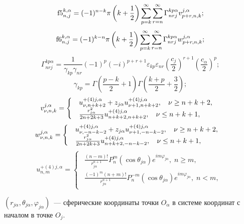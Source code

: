 \begin{theorem}
\[{\rm{f5}}_{n,j}^{k,\alpha } = (-1)^{n-k}\pi \left( {k + \frac{1}{2}} \right)\sum\limits_{p = k}^\infty  {\sum\limits_{r = n}^\infty  {\Gamma _{nrj}^{kp\alpha }v_{p + r,n,k}^{j,\alpha }} };\]
\[{\rm{f6}}_{n,j}^{k,\alpha } = (-1)^{k-n}\pi \left( {k + \frac{1}{2}} \right)\sum\limits_{p = k}^\infty  {\sum\limits_{r = n}^\infty  {\Gamma _{nrj}^{kp\alpha }w_{p + r,n,k}^{j,\alpha }} };\]
\[\Gamma _{nrj}^{kp\alpha } = \frac{1}{{{\gamma _{kp}}{\gamma _{nr}}}}{( - 1)^{p}}(-i)^{p+r+1}{\varepsilon _{kp}}{\varepsilon _{nr}}{\left( {\frac{{{{{c}}_j}}}{2}} \right)^{r + 1}}{\left( {\frac{{{{{c}}_\alpha }}}{2}} \right)^p};\]
\[{\gamma _{kp}} = \Gamma \left( {\frac{{p - k}}{2} + 1} \right)\Gamma \left( {\frac{{k + p}}{2} + \frac{3}{2}} \right);\]
\[v_{\nu ,n,k}^{j,\alpha } = \left\{ {\begin{array}{*{20}{l}}
\begin{array}{l}
u_{\nu ,n + k + 2}^{ + (4)j,\alpha } + {z_{j\alpha }}u_{\nu  + 1,n + k + 2}^{ + (4)j,\alpha },\;\;\;{\kern 1pt} \nu  \ge n + k + 2,\\
\frac{{r_{j\alpha }^2}}{{2n + 2k + 3}}u_{n + k + 2,n + k + 2}^{ + (4)j,\alpha },\;\;\;{\kern 1pt} \nu  \le n + k + 1,
\end{array}
\end{array}} \right.\]
\[w_{\nu ,n,k}^{j,\alpha } = \left\{ {\begin{array}{*{20}{l}}
\begin{array}{l}
u_{\nu , - n - k - 2}^{ + (4)j,\alpha } + {z_{j\alpha }}u_{\nu  + 1, - n - k - 2}^{ + (4)j,\alpha },\;\;\;{\kern 1pt} \nu  \ge n + k + 2,\\
\frac{{r_{j\alpha }^2}}{{2n + 2k + 3}}u_{n + k + 2, - n - k - 2}^{ + (4)j,\alpha },\;\;\;{\kern 1pt} \nu  \le n + k + 1,
\end{array}
\end{array}} \right.\]
\[{{u}}_{n,m}^{ + (4)j,\alpha } = \left\{ {\begin{array}{*{20}{l}}
\begin{array}{l}
\frac{{(n - m)!}}{{r_{j\alpha }^{n + 1}}}P_n^m(\cos {\theta _{j\alpha }}){e^{im{\varphi _{j\alpha }}}},\;n \ge m,\\
\frac{{{{( - 1)}^m}(n + m)!}}{{r_{j\alpha }^{n + 1}}}P_n^{ - m}(\cos {\theta _{j\alpha }}){e^{im{\varphi _{j\alpha }}}},\;n < m,
\end{array}
\end{array}} \right.\]

\noindent $(r_{j\alpha},\theta_{j\alpha},\varphi_{j\alpha})$~--- сферические координаты точки $O_\alpha$ в системе координат с началом в точке $O_j$.
\end{theorem}

